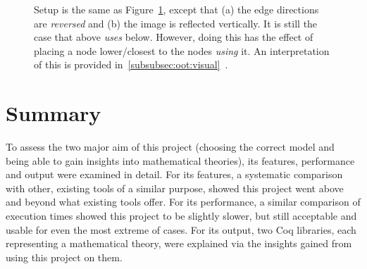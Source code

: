 \begin{figure}[tp]
\begin{minipage}{0.5\textwidth-0.5em}
      \caption{Setup is the same as Figure~\ref{fig:oot:hierflip}, except that
      (a) the edge directions are \emph{reversed} and (b) the image is
      reflected vertically. It is still the case that above \emph{uses} below.
      However, doing this has the effect of placing a node lower/closest to
      the nodes \emph{using} it. An interpretation of this is provided
      in~\ref{subsubsec:oot:visual}~.}\label{fig:oot:hierflip}
  \end{minipage}
\end{figure}

\newpage%
\section{Summary}

To assess the two major aim of this project (choosing the correct model and
being able to gain insights into mathematical theories), its features,
performance and output were examined in detail. For its features, a systematic
comparison with other, existing tools of a similar purpose, showed this project
went above and beyond what existing tools offer. For its performance, a similar
comparison of execution times showed this project to be slightly slower, but
still acceptable and usable for even the most extreme of cases. For its output,
two Coq libraries, each representing a mathematical theory, were explained via
the insights gained from using this project on them.
